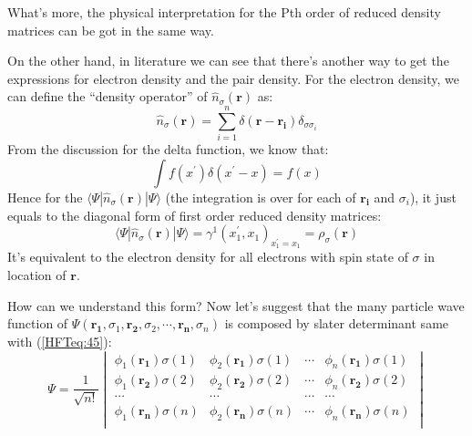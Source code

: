 What's more, the physical interpretation for the Pth order of
reduced density matrices can be got in the same way.

On the other hand, in literature we can see that there's another way
to get the expressions for electron density and the pair density.
For the electron density, we can define the ``density operator'' of
$\hat{n}_{\sigma}(\bm{r})$ as:
\begin{equation}\label{DMeq:41}
\hat{n}_{\sigma}(\bm{r}) = \sum_{i=1}^{n}\delta(\bm{r} -
\bm{r_{i}})\delta_{\sigma\sigma_{i}}
\end{equation}
From the discussion for the delta function, we know that:
\begin{equation}\label{DMeq:43}
\int f(x^{'})\delta(x^{'}-x) = f(x)
\end{equation}
Hence for the $\langle\Psi|\hat{n}_{\sigma}(\bm{r})|\Psi\rangle$
(the integration is over for each of $\bm{r_{i}}$ and $\sigma_{i}$),
it just equals to the diagonal form of first order reduced density
matrices:
\begin{equation}\label{}
\langle\Psi|\hat{n}_{\sigma}(\bm{r})|\Psi\rangle =
\gamma^{1}(x^{'}_{1}, x_{1})_{x^{'}_{1} = x_{1}} =\rho_{\sigma}(\bm{r})
\end{equation}
It's equivalent to the electron density for all electrons with spin
state of $\sigma$ in location of $\bm{r}$.

How can we understand this form? Now let's suggest that the many
particle wave function of $\Psi(\bm{r_{1}}, \sigma_{1}, \bm{r_{2}},
\sigma_{2}, \cdots, \bm{r_{n}}, \sigma_{n})$ is composed by slater
determinant same with (\ref{HFTeq:45}):
\begin{equation}\label{HFTeq:45}
\Psi =\frac{1}{\sqrt{n!}}
\begin{vmatrix}
\phi_{1}(\bm{r_{1}})\sigma(1) &  \phi_{2}(\bm{r_{1}})\sigma(1) & \cdots & \phi_{n}(\bm{r_{1}})\sigma(1)  \\
\phi_{1}(\bm{r_{2}})\sigma(2) &  \phi_{2}(\bm{r_{2}})\sigma(2) & \cdots & \phi_{n}(\bm{r_{2}})\sigma(2)  \\
\cdots               &  \cdots               & \cdots & \cdots                  \\
\phi_{1}(\bm{r_{n}})\sigma(n) &  \phi_{2}(\bm{r_{n}})\sigma(n) & \cdots & \phi_{n}(\bm{r_{n}})\sigma(n)  \\
\end{vmatrix}
\end{equation}

